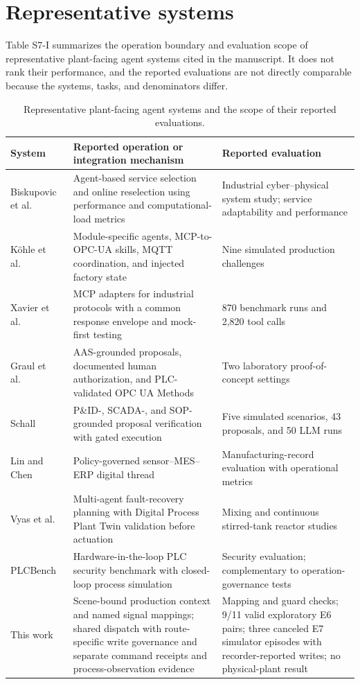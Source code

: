 \documentclass[10pt]{article}
\begin{document}
\section*{Representative systems}
Table S7-I summarizes the operation boundary and evaluation scope of representative plant-facing agent systems cited in the manuscript. It does not rank their performance, and the reported evaluations are not directly comparable because the systems, tasks, and denominators differ.

\begin{table}[h]
\centering
\caption{Representative plant-facing agent systems and the scope of their reported evaluations.}
\footnotesize
\setlength{\tabcolsep}{3pt}
\begin{tabularx}{\textwidth}{@{}>{\raggedright\arraybackslash}p{1.9cm}>{\raggedright\arraybackslash}p{6.2cm}X@{}}
\toprule
System & Reported operation or integration mechanism & Reported evaluation \\
\midrule
Biskupovic et al.~\cite{biskupovic2025supervision} & Agent-based service selection and online reselection using performance and computational-load metrics & Industrial cyber--physical system study; service adaptability and performance \\
K{\"o}hle et al.~\cite{koehle2026llmdriven} & Module-specific agents, MCP-to-OPC-UA skills, MQTT coordination, and injected factory state & Nine simulated production challenges \\
Xavier et al.~\cite{xavier2026industriConnect} & MCP adapters for industrial protocols with a common response envelope and mock-first testing & 870 benchmark runs and 2,820 tool calls \\
Graul et al.~\cite{graul2026aas} & AAS-grounded proposals, documented human authorization, and PLC-validated OPC UA Methods & Two laboratory proof-of-concept settings \\
Schall~\cite{schall2026safe} & P\&ID-, SCADA-, and SOP-grounded proposal verification with gated execution & Five simulated scenarios, 43 proposals, and 50 LLM runs \\
Lin and Chen~\cite{lin2026agentic} & Policy-governed sensor--MES--ERP digital thread & Manufacturing-record evaluation with operational metrics \\
Vyas et al.~\cite{vyas2026detection} & Multi-agent fault-recovery planning with Digital Process Plant Twin validation before actuation & Mixing and continuous stirred-tank reactor studies \\
PLCBench~\cite{zhou2026plcbench} & Hardware-in-the-loop PLC security benchmark with closed-loop process simulation & Security evaluation; complementary to operation-governance tests \\
This work & Scene-bound production context and named signal mappings; shared dispatch with route-specific write governance and separate command receipts and process-observation evidence & Mapping and guard checks; 9/11 valid exploratory E6 pairs; three canceled E7 simulator episodes with recorder-reported writes; no physical-plant result \\
\bottomrule
\end{tabularx}
\end{table}
\end{document}
